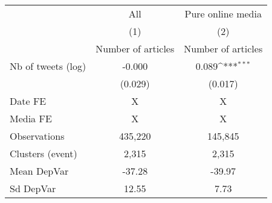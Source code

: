 {
\def\sym#1{\ifmmode^{#1}\else\(^{#1}\)\fi}
\begin{tabular}{l*{2}{c}}
\hline\hline
                    &\multicolumn{1}{c}{All}&\multicolumn{1}{c}{Pure online media}\\\cmidrule(lr){2-2}\cmidrule(lr){3-3}
                    &\multicolumn{1}{c}{(1)}&\multicolumn{1}{c}{(2)}\\
                    &\multicolumn{1}{c}{Number of articles}&\multicolumn{1}{c}{Number of articles}\\
\hline
Nb of tweets (log)  &      -0.000         &       0.089\sym{***}\\
                    &     (0.029)         &     (0.017)         \\
\hline
Date FE             &           X         &           X         \\
Media FE            &           X         &           X         \\
Observations        &     435,220         &     145,845         \\
Clusters (event)    &       2,315         &       2,315         \\
Mean DepVar         &      -37.28         &      -39.97         \\
Sd DepVar           &       12.55         &        7.73         \\
\hline\hline
\end{tabular}
}
